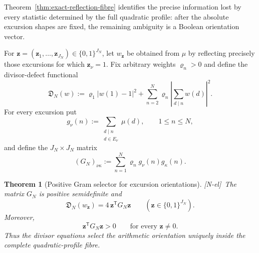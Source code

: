 \documentclass[11pt,reqno]{amsart}
\numberwithin{equation}{section}
\theoremstyle{plain}
\newtheorem{theorem}{Theorem}[section]
\theoremstyle{definition}
\theoremstyle{remark}
\newcommand{\tagNE}{\textup{[N-el]}}
\begin{document}
Theorem~\ref{thm:exact-reflection-fibre} identifies the precise information lost by every statistic determined by the full quadratic profile: after the absolute excursion shapes are fixed, the remaining ambiguity is a Boolean orientation vector.

For $\mathbf z=(\mathbf z_1,\dots,\mathbf z_{J_N})\in\{0,1\}^{J_N}$, let $w_\mathbf z$ be obtained from $\mu$ by reflecting precisely those excursions for which $\mathbf z_\nu=1$.  Fix arbitrary weights $\varrho_n>0$ and define the divisor-defect functional
\begin{equation}
\mathfrak D_N(w)
:=
\varrho_1|w(1)-1|^2
+
\sum_{n=2}^N\varrho_n
\left|\sum_{d\mid n}w(d)\right|^2.
\label{eq:divisor-defect-functional}
\end{equation}
For every excursion put
\begin{equation}
g_\nu(n):=
\sum_{\substack{d\mid n\\ d\in E_\nu}}\mu(d),
\qquad 1\le n\le N,
\label{eq:excursion-divisor-signal-new}
\end{equation}
and define the $J_N\times J_N$ matrix
\begin{equation}
(G_N)_{\nu\kappa}
:=
\sum_{n=1}^N\varrho_n g_\nu(n)g_\kappa(n).
\label{eq:orientation-gram-new}
\end{equation}

\begin{theorem}[Positive Gram selector for excursion orientations]
\label{thm:positive-gram-selector}
\tagNE\ The matrix $G_N$ is positive semidefinite and
\begin{equation}
\mathfrak D_N(w_\mathbf z)
=
4\,\mathbf z^{\mathsf T}G_N\mathbf z
\qquad
(\mathbf z\in\{0,1\}^{J_N}).
\label{eq:gram-selector-identity}
\end{equation}
Moreover,
\begin{equation}
\mathbf z^{\mathsf T}G_N\mathbf z>0
\qquad\text{for every }\mathbf z\ne0.
\label{eq:boolean-strict-positivity}
\end{equation}
Thus the divisor equations select the arithmetic orientation uniquely inside the complete quadratic-profile fibre.
\end{theorem}
\end{document}

